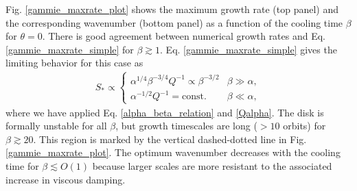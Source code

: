 Fig. \ref{gammie_maxrate_plot} shows the maximum
growth rate (top panel) and the corresponding wavenumber (bottom
panel) as a function of the cooling time $\beta$ for $\theta=0$.  
There is good agreement between numerical growth rates and
Eq. \ref{gammie_maxrate_simple} for $\beta \gtrsim 1$. 
Eq. \ref{gammie_maxrate_simple} gives the
limiting behavior for this case as   
\begin{align*}
  S_*\propto \begin{cases}
    \alpha^{1/4}\beta^{-3/4}Q^{-1}\propto \beta^{-3/2} 
    &  \beta \gg \alpha, \\
    \alpha^{-1/2}Q^{-1} = \mathrm{const.} & \beta \ll \alpha,    
  \end{cases}
\end{align*}
where we have applied Eq. \ref{alpha_beta_relation}
and \ref{Qalpha}. The disk is formally unstable for all $\beta$, but
growth timescales are long ($>10$ orbits) for $\beta \gtrsim
20$. This region is marked by the vertical dashed-dotted line in
Fig. \ref{gammie_maxrate_plot}. The optimum wavenumber decreases with
the cooling time for $\beta\lesssim O(1)$ because larger scales are
more resistant to the associated increase in viscous damping.      


